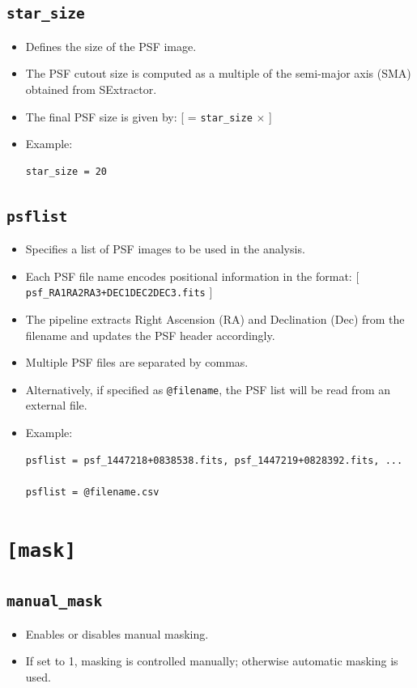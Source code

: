 \documentclass[11pt]{article}
\begin{document}
\subsection{\texttt{star\_size}}
\begin{itemize}
\item Defines the size of the PSF image.
\item The PSF cutout size is computed as a multiple of the semi-major axis (SMA) obtained from SExtractor.
\item The final PSF size is given by:
[
 = \texttt{star\_size} $\times$ 
]
\item Example:
\begin{verbatim}
star_size = 20
\end{verbatim}
\end{itemize}

\subsection{\texttt{psflist}}
\begin{itemize}
\item Specifies a list of PSF images to be used in the analysis.
\item Each PSF file name encodes positional information in the format:
[
\texttt{psf\_RA1RA2RA3+DEC1DEC2DEC3.fits}
]
\item The pipeline extracts Right Ascension (RA) and Declination (Dec) from the filename and updates the PSF header accordingly.
\item Multiple PSF files are separated by commas.
\item Alternatively, if specified as \verb|@filename|, the PSF list will be read from an external file.
\item Example:
\begin{verbatim}
psflist = psf_1447218+0838538.fits, psf_1447219+0828392.fits, ...

psflist = @filename.csv
\end{verbatim}
\end{itemize}

\section{\texttt{[mask]}}

\subsection{\texttt{manual\_mask}}
\begin{itemize}
\item Enables or disables manual masking.
\item If set to 1, masking is controlled manually; otherwise automatic masking is used.
\end{itemize}
\end{document}
